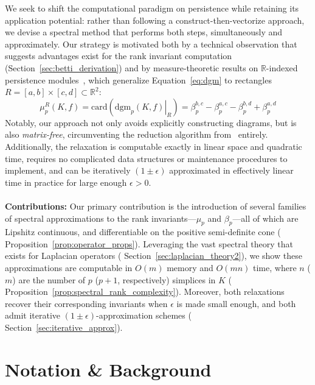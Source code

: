 \documentclass[pdflatex,sn-mathphys-num]{sn-jnl}
\begin{document}
We seek to shift the computational paradigm on persistence while retaining its application potential: rather than following a construct-then-vectorize approach, we devise a spectral method that performs both steps, simultaneously and approximately. Our strategy is motivated both by a technical observation that suggests advantages exist for the rank invariant computation (Section~\ref{sec:betti_derivation}) and by measure-theoretic results on $\mathbb{R}$-indexed persistence modules~\cite{cerri2013betti, chazal2016structure}, which generalize Equation~\ref{eq:dgm} to rectangles $R = [a , b] \times [c , d] \subset \mathbb{R}^2$: 
\begin{equation}\label{eq:measure}
\mu_p^{R}(K, f) = \mathrm{card} (\left.\mathrm{dgm}_p(K, f)\right|_R) = 
\beta_p^{b,c} - \beta_p^{a,c} - \beta_p^{b,d} + \beta_p^{a,d}
\end{equation}
Notably, our approach not only avoids explicitly constructing diagrams, but is also \emph{matrix-free}, circumventing the reduction algorithm from~\cite{edelsbrunner2022computational} entirely. Additionally, the relaxation is computable exactly in linear space and quadratic time, requires no complicated data structures or maintenance procedures to implement, and can be iteratively $(1 \pm \epsilon)$ approximated in effectively linear time in practice for large enough $\epsilon > 0$. 
\\
\\
\noindent
\textbf{Contributions:} Our primary contribution is the introduction of several families of spectral approximations to the rank invariants—$\mu_p$ and $\beta_p$—all of which are Lipshitz continuous, and differentiable on the positive semi-definite cone ( Proposition~\ref{prop:operator_props}). Leveraging the vast spectral theory that exists for Laplacian operators ( Section~\ref{sec:laplacian_theory2}), we show these approximations are computable in $O (m)$ memory and $O (m n)$ time, where $n$ ($m$) are the number of $p$ ($p + 1$, respectively) simplices in $K$ ( Proposition~\ref{prop:spectral_rank_complexity}). Moreover, both relaxations recover their corresponding invariants when $\epsilon$ is made small enough, and both admit iterative $(1 \pm \epsilon)$-approximation schemes ( Section~\ref{sec:iterative_approx}).  

\section{Notation \& Background}\label{sec:background_notation}
\end{document}
